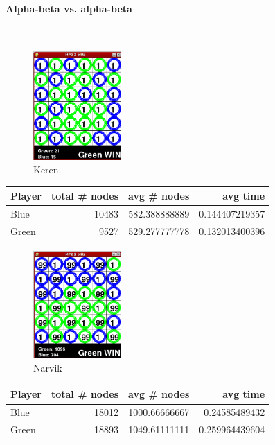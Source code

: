 \begin{multicols*}{2}
\paragraph*{Alpha-beta vs. alpha-beta}
\mbox{}\\
\begin{figure}[H]
\centering
\includegraphics[width=0.3\textwidth]{graphics/aa_keren.png}
\caption{Keren}
\end{figure}
\begin{tabular}{l|r|r|r}
  Player & total \# nodes & avg \# nodes & avg time \\
  \hline
  Blue & 10483 & 582.388888889 & 0.144407219357 \\
  Green & 9527 & 529.277777778 & 0.132013400396 \\
\end{tabular}

\begin{figure}[H]
\centering
\includegraphics[width=0.3\textwidth]{graphics/aa_narvik.png}
\caption{Narvik}
\end{figure}
\begin{tabular}{l|r|r|r}
  Player & total \# nodes & avg \# nodes & avg time \\
  \hline
  Blue & 18012 & 1000.66666667 & 0.24585489432 \\
  Green & 18893 & 1049.61111111 & 0.259964439604 \\
\end{tabular}


\end{multicols*}

